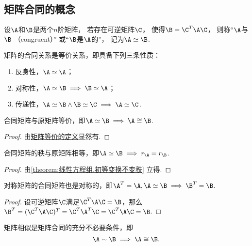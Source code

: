 \subsection{矩阵合同的概念}
\begin{definition}
设\(\A\)和\(\B\)是两个\(n\)阶矩阵，
若存在可逆矩阵\(\C\)，
使得\(\B=\C^T\A\C\)，
则称“\(\A\)与\(\B\) （congruent）”%
或“\(\B\)是\(\A\)的”，
记为\(\A\simeq\B\).
\end{definition}

\begin{property}
矩阵的合同关系是等价关系，即具备下列三条性质：
\begin{enumerate}
\item 反身性，\(\A\simeq\A\)；
\item 对称性，\(\A\simeq\B \implies \B\simeq\A\)；
\item 传递性，\(\A\simeq\B \land \B\simeq\C \implies \A\simeq\C\).
\end{enumerate}
\end{property}

\begin{property}
合同矩阵与原矩阵等价，即\(\A\simeq\B \implies \A\cong\B\).
\begin{proof}
由\hyperref[definition:逆矩阵.矩阵等价]{矩阵等价的定义}显然有.
\end{proof}
\end{property}

\begin{property}
合同矩阵的秩与原矩阵相等，即\(\A\simeq\B \implies r_{\A}=r_{\B}\).
\begin{proof}
由\cref{theorem:线性方程组.初等变换不变秩} 立得.
\end{proof}
\end{property}

\begin{property}
对称矩阵的合同矩阵也是对称的，即\(\A^T = \A, \A\simeq\B \implies \B^T = \B\).
\begin{proof}
设可逆矩阵\(\C\)满足\(\C^T\A\C=\B\)，那么%
\(\B^T = (\C^T\A\C)^T = \C^T\A^T\C = \C^T\A\C = \B\).
\end{proof}
\end{property}

\begin{property}
矩阵相似是矩阵合同的充分不必要条件，即\[
\A\sim\B
\implies
\A\cong\B.
\]
\end{property}

